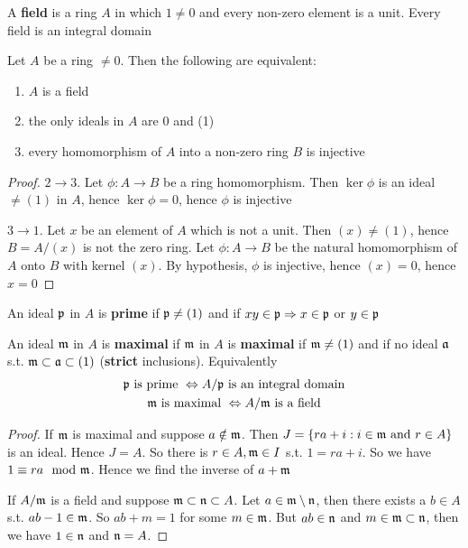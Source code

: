 \documentclass[11pt]{article}
\begin{document}
A \textbf{field} is a ring \(A\) in which \(1\neq 0\) and every non-zero element is a unit. Every field is
an integral domain

\begin{proposition}[]
\label{1.2}
Let \(A\) be a ring \(\neq 0\). Then the following are equivalent:
\begin{enumerate}
\item \(A\) is a field
\item the only ideals in \(A\) are 0 and (1)
\item every homomorphism of \(A\) into a non-zero ring \(B\) is injective
\end{enumerate}
\end{proposition}

\begin{proof}
\(2\to 3\). Let \(\phi:A\to B\) be a ring homomorphism. Then \(\ker\phi\) is an ideal \(\neq(1)\) in \(A\),
hence \(\ker\phi=0\), hence \(\phi\) is injective

\(3\to 1\). Let \(x\) be an element of \(A\) which is not a unit. Then \((x)\neq(1)\),
hence \(B=A/(x)\) is not the zero ring. Let \(\phi:A\to B\) be the natural homomorphism of \(A\)
onto \(B\) with kernel \((x)\). By hypothesis, \(\phi\) is injective, hence \((x)=0\), hence \(x=0\)
\end{proof}

An ideal \(\mathfrak{p}\) in \(A\) is \textbf{prime} if \(\mathfrak{p}\neq(1)\) and if \(xy\in\mathfrak{p}\Rightarrow x\in\mathfrak{p}\) or \(y\in\mathfrak{p}\)

An ideal \(\mathfrak{m}\) in \(A\) is \textbf{maximal} if \(\mathfrak{m}\) in \(A\) is \textbf{maximal} if \(\mathfrak{m}\neq(1)\) and if no
ideal \(\mathfrak{a}\) s.t. \(\mathfrak{m}\subset\mathfrak{a}\subset(1)\) (\textbf{strict} inclusions). Equivalently
\begin{gather*}
\mathfrak{p}\text{ is prime } \Leftrightarrow A/\mathfrak{p}\text{ is an integral domain}\\
\mathfrak{m}\text{ is maximal } \Leftrightarrow A/\mathfrak{m}\text{ is a field}
\end{gather*}
\begin{proof}
If \(\mathfrak{m}\) is maximal and suppose \(a\notin\mathfrak{m}\). Then \(J=\{ra+i:i\in \mathfrak{m}\text{ and }r\in A\}\) is an ideal.
Hence \(J=A\). So there is \(r\in A, \mathfrak{m}\in I\) s.t. \(1=ra+i\). So we have \(1\equiv ra\mod {\mathfrak{m}}\). Hence we
find the inverse of \(a+\mathfrak{m}\)

If \(A/\mathfrak{m}\) is a field and suppose \(\mathfrak{m}\subset\mathfrak{n}\subset A\). Let \(a\in\mathfrak{m}\setminus\mathfrak{n}\), then there exists a \(b\in A\)
s.t. \(ab-1\in\mathfrak{m}\). So \(ab+m=1\) for some \(m\in\mathfrak{m}\). But \(ab\in\mathfrak{n}\) and \(m\in\mathfrak{m}\subset\mathfrak{n}\), then we
have \(1\in\mathfrak{n}\) and \(\mathfrak{n}=A\).
\end{proof}
\end{document}

